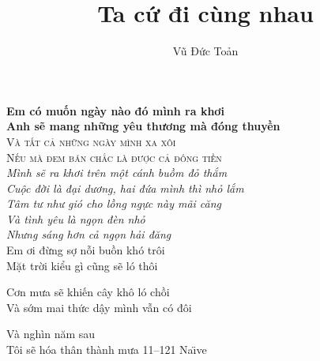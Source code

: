 \documentclass[12pt,a4paper]{report}
\title{Ta cứ đi cùng nhau}
\author{Vũ Đức Toản}
\begin{document}
 
\maketitle
	\textbf{Em có muốn ngày nào đó mình ra khơi \\
		Anh sẽ mang những yêu thương mà đóng thuyền\\}
	\textsc{Và tất cả những ngày mình xa xôi \\
		Nếu mà đem bán chắc là được cả đống tiền\\ }
	\emph{Mình sẽ ra khơi trên một cánh buồm đỏ thắm \\
		Cuộc đời là đại dương, hai đứa mình thì nhỏ lắm\\ }
	\textit{Tâm tư như gió cho lồng ngực này mãi căng \\
		Và tình yêu là ngọn đèn nhỏ\\}
	\textsl{Nhưng sáng hơn cả ngọn hải đăng }
	\ttfamily
\\	Em ơi đừng sợ nỗi buồn khó trôi \\
	Mặt trời kiểu gì cũng sẽ ló thôi\\
\normalfont
	\begin{upshape}
		
	Cơn mưa sẽ khiến cây khô ló chồi \\
		Và sớm mai thức dậy mình vẫn có đôi\\
	\end{upshape}
\small Và nghìn năm sau\\
\huge Tôi sẽ hóa thân thành mưa 11--121 Na\"{\i}ve \\
\end{document}

